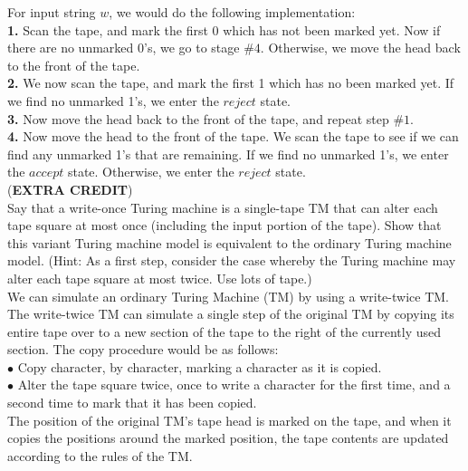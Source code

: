 \documentclass[12pt]{article}
\begin{document}
For input string $w$, we would do the following implementation: \\
\textbf{1.} Scan the tape, and mark the first 0 which has not been marked
yet. Now if there are no unmarked 0's, we go to stage $\# 4$. Otherwise,
we move the head back to the front of the tape. \\

\textbf{2.} We now scan the tape, and mark the first 1 which has no been
marked yet. If we find no unmarked 1's, we enter the $reject$ state. \\

\textbf{3.} Now move the head back to the front of the tape, and repeat
step $\# 1$. \\

\textbf{4.} Now move the head to the front of the tape. We scan the tape
to see if we can find any unmarked 1's that are remaining. If we find no
unmarked 1's, we enter the $accept$ state. Otherwise, we enter the $reject$
state. \\

 (\textbf{EXTRA CREDIT}) \\

Say that a write-once Turing machine is a single-tape TM that can alter each tape
square at most once (including the input portion of the tape). Show that this variant
Turing machine model is equivalent to the ordinary Turing machine model. 
(Hint: As a first step, consider the case whereby the Turing machine may alter each
tape square at most twice. Use lots of tape.) \\

We can simulate an ordinary Turing Machine (TM) by using a write-twice TM. The
write-twice TM can simulate a single step of the original TM by copying its entire
tape over to a new section of the tape to the right of the currently used section.
The copy procedure would be as follows: \\

$\bullet$ Copy character, by character, marking a character as it is copied. \\
$\bullet$ Alter the tape square twice, once to write a character for the first time, and
a second time to mark that it has been copied. \\

The position of the original TM's tape head is marked on the tape, and when it
copies the positions around the marked position, the tape contents are updated
according to the rules of the TM. \\
\end{document}
